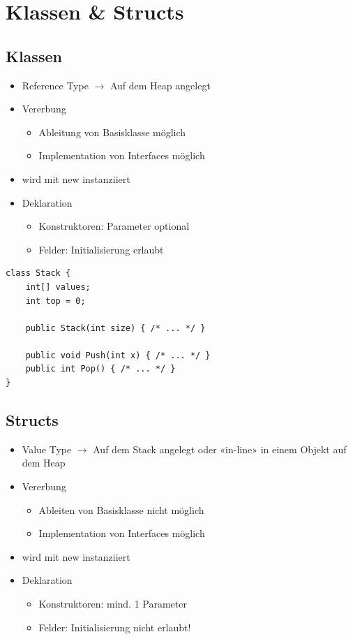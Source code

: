 
\section{Klassen \& Structs}

\subsection{Klassen}
\begin{itemize}
    \item Reference Type $\rightarrow$ Auf dem Heap angelegt
    \item Vererbung
    \begin{itemize}
        \item Ableitung von Basisklasse möglich
        \item Implementation von Interfaces möglich
    \end{itemize}
    \item wird mit new instanziiert
    \item Deklaration
    \begin{itemize}
        \item Konstruktoren: Parameter optional
        \item Felder: Initialisierung erlaubt
    \end{itemize}
\end{itemize}

\begin{lstlisting}
class Stack {
    int[] values;
    int top = 0;

    public Stack(int size) { /* ... */ }

    public void Push(int x) { /* ... */ }
    public int Pop() { /* ... */ }
}
\end{lstlisting}

\subsection{Structs}
\begin{itemize}
    \item Value Type $\rightarrow$ Auf dem Stack angelegt oder «in-line» in einem Objekt auf dem Heap
    \item Vererbung
    \begin{itemize}
        \item Ableiten von Basisklasse nicht möglich
        \item Implementation von Interfaces möglich
    \end{itemize}
    \item wird mit new instanziiert
    \item Deklaration
    \begin{itemize}
        \item Konstruktoren: mind. 1 Parameter
        \item Felder: Initialisierung nicht erlaubt!
    \end{itemize}
\end{itemize}


